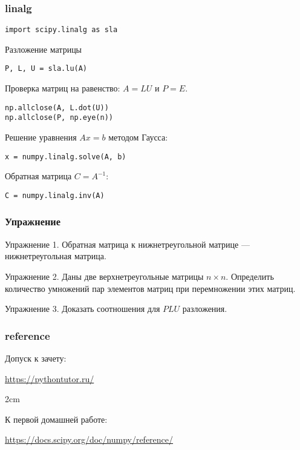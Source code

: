 \documentclass[10pt]{beamer}
\begin{document}
\begin{frame}[fragile]
\frametitle{linalg}
\begin{lstlisting}
import scipy.linalg as sla
\end{lstlisting}

Разложение матрицы
\begin{lstlisting}
P, L, U = sla.lu(A)
\end{lstlisting}

Проверка матриц на равенство: $A = LU$ и $P = E$.
\begin{lstlisting}
np.allclose(A, L.dot(U))
np.allclose(P, np.eye(n))
\end{lstlisting}

Решение уравнения $Ax = b$ методом Гаусса:
\begin{lstlisting}
x = numpy.linalg.solve(A, b)
\end{lstlisting}

Обратная матрица $C = A^{-1}$:
\begin{lstlisting}
C = numpy.linalg.inv(A)
\end{lstlisting}

\end{frame}

\begin{frame}[fragile]
\frametitle{Упражнение}
Упражнение 1. Обратная матрица к нижнетреугольной матрице --- нижнетреугольная матрица.

Упражнение 2. Даны две верхнетреугольные матрицы $n \times n$. Определить количество умножений пар элементов матриц при перемножении этих матриц.

Упражнение 3. Доказать соотношения для $PLU$ разложения.
\end{frame}


\begin{frame}[fragile]
\frametitle{reference}

Допуск к зачету:

\url{https://pythontutor.ru/}

\vfill{2cm}

К первой домашней работе:

\url{https://docs.scipy.org/doc/numpy/reference/}

\end{frame}
\end{document}
